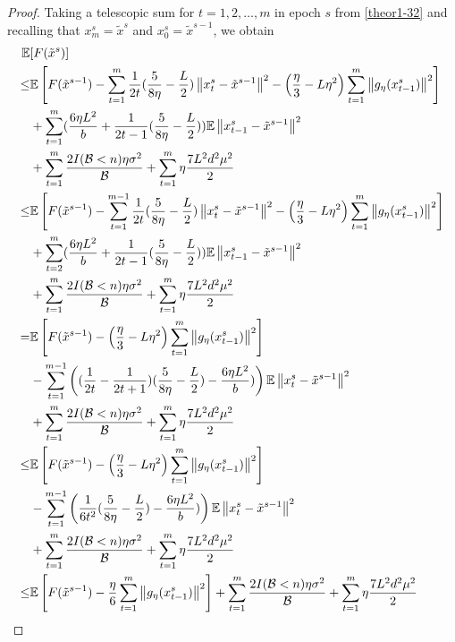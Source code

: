 \documentclass[iicol,sn-basic]{sn-jnl}
\theoremstyle{thmstyleone}%
\theoremstyle{thmstyletwo}%
\theoremstyle{thmstylethree}%
\newcommand*{\E}{\mathbb{E}}
\newcommand{\norm}[1]{\left\lVert#1\right\rVert}
\begin{document}
\begin{proof}
Taking a telescopic sum for $t = 1, 2, \ldots, m$ in epoch $s$ from \eqref{theor1-32} and recalling that $x_m^s = \tilde{x}^s$ and $x_0^s = \tilde{x}^{s-1}$, we obtain
 \begin{align} 
\E&[F(\tilde{x}^s)] \notag
\\ \leq& \E\left[F(\tilde{x}^{s-1})  -\sum_{t=1}^m\frac{1}{2t}(\frac{5}{8\eta} - \frac{L}{2})\norm{{x}_t^s-\tilde{x}^{s-1}}^2- \left(\frac{\eta}{3}-L\eta^2\right)\sum_{t=1}^m\norm{g_{\eta}(x_{t-1}^s)}^2\right]\notag\\
&+\sum_{t=1}^m(\frac{6\eta L^2}{b}+\frac{1}{2t-1}(\frac{5}{8\eta} - \frac{L}{2}))\E\norm{x_{t-1}^s-\tilde{x}^{s-1}}^2\notag\\
&+ \sum_{t=1}^m \frac{2I(\mathcal{B} < n)\eta \sigma ^2}{\mathcal{B}}+\sum_{t=1}^m \eta \frac{7L^2 d^2 \mu^2}{2}\notag\\
\leq& \E\left[F(\tilde{x}^{s-1})  -\sum_{t=1}^{m-1}\frac{1}{2t}(\frac{5}{8\eta} - \frac{L}{2})\norm{{x}_t^s-\tilde{x}^{s-1}}^2- \left(\frac{\eta}{3}-L\eta^2\right)\sum_{t=1}^m\norm{g_{\eta}(x_{t-1}^s)}^2\right]\notag\\
&+\sum_{t=2}^m(\frac{6\eta L^2}{b}+\frac{1}{2t-1}(\frac{5}{8\eta} - \frac{L}{2}))\E\norm{x_{t-1}^s-\tilde{x}^{s-1}}^2\notag\\
&+ \sum_{t=1}^m \frac{2I(\mathcal{B} < n)\eta \sigma ^2}{\mathcal{B}}+\sum_{t=1}^m \eta \frac{7L^2 d^2 \mu^2}{2}\label{theor1-34}
\\
=& \E\left[F(\tilde{x}^{s-1}) - \left(\frac{\eta}{3}-L\eta^2\right)\sum_{t=1}^m\norm{g_{\eta}(x_{t-1}^s)}^2\right]\notag\\
&-\sum_{t=1}^{m-1}\left((\frac{1}{2t} - \frac{1}{2t+1})(\frac{5}{8\eta} - \frac{L}{2})-\frac{6\eta L^2 }{b})\right)\E\norm{x_{t}^s-\tilde{x}^{s-1}}^2\notag\\
&+ \sum_{t=1}^m \frac{2I(\mathcal{B} < n)\eta \sigma ^2}{\mathcal{B}}+\sum_{t=1}^m \eta \frac{7 L^2 d^2 \mu^2}{2}\notag\\
\leq& \E\left[F(\tilde{x}^{s-1}) - \left(\frac{\eta}{3}-L\eta^2\right)\sum_{t=1}^m\norm{g_{\eta}(x_{t-1}^s)}^2\right]\notag\\
&-\sum_{t=1}^{m-1}\left(\frac{1}{6t^2}(\frac{5}{8\eta} - \frac{L}{2})-\frac{6\eta L^2 }{b})\right)\E\norm{x_{t}^s-\tilde{x}^{s-1}}^2\notag\\
&+ \sum_{t=1}^m \frac{2I(\mathcal{B} < n)\eta \sigma ^2}{\mathcal{B}}+\sum_{t=1}^m \eta \frac{7 L^2 d^2 \mu^2}{2}\notag\\
\leq& \E\left[F(\tilde{x}^{s-1}) - \frac{\eta}{6}\sum_{t=1}^m\norm{g_{\eta}(x_{t-1}^s)}^2\right]+ \sum_{t=1}^m \frac{2I(\mathcal{B} < n)\eta \sigma ^2}{\mathcal{B}}+\sum_{t=1}^m \eta \frac{7 L^2 d^2 \mu^2}{2}\label{theor1-35}

\end{align}
\end{proof}
\end{document}
